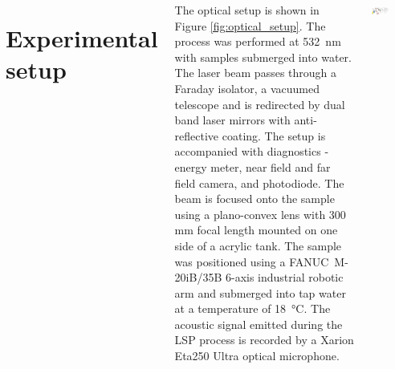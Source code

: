 \documentclass[20pt,margin=1in,innermargin=-4.5in,blockverticalspace=-0.25in]{tikzposter}
\begin{document}
\begin{columns}
{    \section*{Experimental setup}
    The optical setup is shown in Figure \ref{fig:optical_setup}. The process was performed at \SI{532}{\nano\meter} with samples submerged into water. The laser beam passes through a Faraday isolator, a vacuumed telescope and is redirected by dual band laser mirrors with anti-reflective coating. The setup is accompanied with diagnostics - energy meter, near field and far field camera, and photodiode. The beam is focused onto the sample using a plano-convex lens with 300 mm focal length mounted on one side of a acrylic tank. The sample was positioned using a FANUC~M-20iB/35B 6-axis industrial robotic arm and   submerged into tap water at a temperature of \SI{18}{\celsius}.
    The acoustic signal emitted during the LSP process is recorded by a Xarion Eta250 Ultra optical microphone.



        \begin{tikzfigure}        
        \includegraphics[width=0.45\textwidth,valign=c]{img/optical setup final_v_10.png}
        \label{fig:optical_setup}
        \end{tikzfigure}








}






\end{columns}
\end{document}
